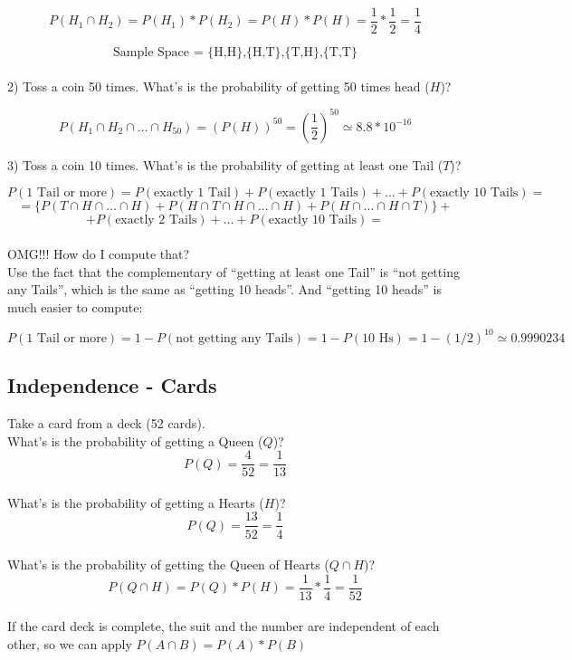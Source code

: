 \documentclass[11pt]{article}
\begin{document}
	\[P(H_1\cap H_2) = P(H_1) * P(H_2) = P(H) * P(H) =\frac{1}{2} * \frac{1}{2} = \frac{1}{4}\]

	\[\text{Sample Space = \{H,H\},\{H,T\},\{T,H\},\{T,T\}}\]\\
	
	2) Toss a coin 50 times. What's is the probability of getting 50 times head ($H$)?

	\[P(H_1\cap H_2 \cap...\cap H_{50}) = (P(H))^{50} = (\frac{1}{2})^{50} \simeq 8.8 * 10^{-16}\]
	
	3) Toss a coin 10 times. What's is the probability of  getting at least one Tail ($T$)?
	
	\[P(\text{1 Tail or more}) = P(\text{exactly 1 Tail}) + P(\text{exactly 1 Tails}) + ... + P(\text{exactly 10 Tails}) =\]
	\[= \{P(T\cap H \cap ... \cap H) + P(H \cap T\cap H \cap ... \cap H) + P(H \cap ... \cap H \cap T)\} +  \]
	\[+P(\text{exactly 2 Tails}) + ... + P(\text{exactly 10 Tails}) =\]\\

	OMG!!! How do I compute that?\\

	Use the fact that the complementary of ``getting at least one Tail'' is ``not getting any Tails'', which is the same as ``getting 10 heads''. And ``getting 10 heads'' is much easier to compute:
	
	\[P(\text{1 Tail or more}) = 1 - P(\text{not getting any Tails}) = 1 - P(\text{10 Hs}) = 1 - (1/2)^{10}  \simeq 0.9990234\]


	\subsection*{Independence - Cards}
	
	Take a card from a deck (52 cards).\\
	
	What's is the probability of getting a Queen ($Q$)?
	\[P(Q) = \frac{4}{52} = \frac{1}{13}\]\\
	
	What's is the probability of getting a Hearts ($H$)?
	\[P(Q) = \frac{13}{52} = \frac{1}{4}\]\\
	
	
	What's is the probability of getting the Queen of Hearts ($Q \cap H$)?
	\[P(Q \cap H) = P(Q) * P(H) = \frac{1}{13} * \frac{1}{4} = \frac{1}{52}\]\\

	If the card deck is complete, the suit and the number are independent of each other, so we can apply $P(A \cap B) = P(A) * P(B)$
\end{document}
